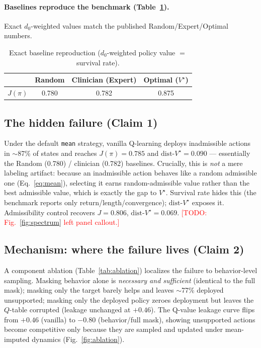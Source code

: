 \documentclass{article}
\newcommand{\dist}{\mathrm{dist}\text{-}V^\star}
\newcommand{\todo}[1]{\textcolor{red}{[TODO: #1]}}
\begin{document}
\paragraph{Baselines reproduce the benchmark (Table~\ref{tab:baselines}).}
Exact $d_0$-weighted values match the published Random/Expert/Optimal numbers.

\begin{table}[t]
\centering
\caption{Exact baseline reproduction ($d_0$-weighted policy value $=$ survival rate).}
\label{tab:baselines}
\begin{tabular}{lccc}
\toprule
 & Random & Clinician (Expert) & Optimal ($V^\star$) \\
\midrule
$J(\pi)$ & 0.780 & 0.782 & 0.875 \\
\bottomrule
\end{tabular}
\end{table}

\subsection{The hidden failure (Claim 1)}
\label{sec:failure}
Under the default \texttt{mean} strategy, vanilla Q-learning deploys inadmissible
actions in $\sim$87\% of states and reaches $J(\pi){=}0.785$ and
$\dist{=}0.090$ --- essentially the Random (0.780) / clinician (0.782) baselines.
Crucially, this is \emph{not} a mere labeling artifact: because an inadmissible
action behaves like a random admissible one (Eq.~\eqref{eq:mean}), selecting it
earns random-admissible value rather than the best admissible value, which is
exactly the gap to $V^\star$. Survival rate hides this (the benchmark reports only
return/length/convergence); $\dist$ exposes it. Admissibility control recovers
$J{=}0.806$, $\dist{=}0.069$. \todo{Fig.~\ref{fig:spectrum} left panel callout.}

\subsection{Mechanism: where the failure lives (Claim 2)}
\label{sec:mechanism}
A component ablation (Table~\ref{tab:ablation}) localizes the failure to
behavior-level sampling. Masking behavior alone is \emph{necessary and sufficient}
(identical to the full mask); masking only the target barely helps and leaves
$\sim$77\% deployed unsupported; masking only the deployed policy zeroes deployment
but leaves the $Q$-table corrupted (leakage unchanged at $+0.46$). The Q-value
leakage curve flips from $+0.46$ (vanilla) to $-0.80$ (behavior/full mask),
showing unsupported actions become competitive only because they are sampled and
updated under mean-imputed dynamics (Fig.~\ref{fig:ablation}).
\end{document}
